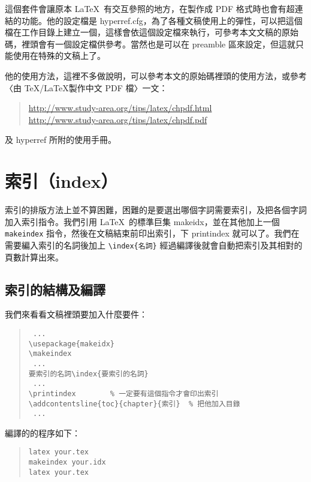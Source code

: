 這個套件會讓原本 \LaTeX\ 有交互參照的地方，在製作成 PDF 格式時也會有超連結的功能。他的設定檔是 {\ttfamily hyperref.cfg}，為了各種文稿使用上的彈性，可以把這個檔在工作目錄上建立一個，這樣會依這個設定檔來執行，可參考本文文稿的原始碼，裡頭會有一個設定檔供參考。當然也是可以在 preamble 區來設定，但這就只能使用在特殊的文稿上了。

他的使用方法，這裡不多做說明，可以參考本文的原始碼裡頭的使用方法，或參考〈由 \TeX/\LaTeX 製作中文 PDF 檔〉一文：

\begin{quote}
  \url{http://www.study-area.org/tips/latex/chpdf.html}\\
  \url{http://www.study-area.org/tips/latex/chpdf.pdf}
\end{quote}

及 {\sffamily hyperref} 所附的使用手冊。

\section{索引（index）}
\label{sec:index}

索引的排版方法上並不算困難，困難的是要選出哪個字詞需要索引，及把各個字詞加入索引指令。我們引用 \LaTeX\ 的標準巨集 \textsf{makeidx}，並在其他加上一個 \texttt{makeindex} 指令，然後在文稿結束前印出索引，下 {\ttfamily printindex} 就可以了。我們在需要編入索引的名詞後加上 \verb|\index{名詞}| 經過編譯後就會自動把索引及其相對的頁數計算出來。

\subsection{索引的結構及編譯}

我們來看看文稿裡頭要加入什麼要件：

\begin{quote}
  \begin{verbatim}
 ...
\usepackage{makeidx}
\makeindex
 ...
要索引的名詞\index{要索引的名詞}
 ...
\printindex        % 一定要有這個指令才會印出索引
\addcontentsline{toc}{chapter}{索引}  % 把他加入目錄
 ...
\end{verbatim}
\end{quote}

編譯的的程序如下：

\begin{quote}
  \begin{verbatim}
latex your.tex
makeindex your.idx
latex your.tex
\end{verbatim}
\end{quote}

